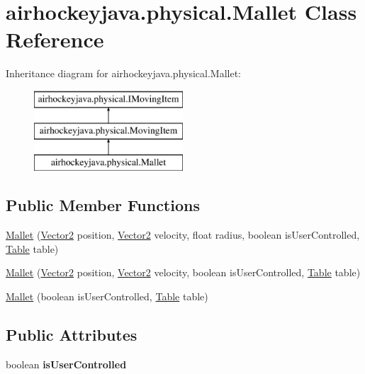 \hypertarget{classairhockeyjava_1_1physical_1_1_mallet}{}\section{airhockeyjava.\+physical.\+Mallet Class Reference}
\label{classairhockeyjava_1_1physical_1_1_mallet}
Inheritance diagram for airhockeyjava.\+physical.\+Mallet\+:\begin{figure}[H]
\begin{center}
\leavevmode
\includegraphics[height=3.000000cm]{classairhockeyjava_1_1physical_1_1_mallet}
\end{center}
\end{figure}
\subsection*{Public Member Functions}
\begin{DoxyCompactItemize}
\item 
\hyperlink{classairhockeyjava_1_1physical_1_1_mallet_a0e2fca7da8983a505fd85b7630c384e5}{Mallet} (\hyperlink{classairhockeyjava_1_1util_1_1_vector2}{Vector2} position, \hyperlink{classairhockeyjava_1_1util_1_1_vector2}{Vector2} velocity, float radius, boolean is\+User\+Controlled, \hyperlink{classairhockeyjava_1_1physical_1_1_table}{Table} table)
\item 
\hyperlink{classairhockeyjava_1_1physical_1_1_mallet_ad25f8cb041c07c7fdef913868231d7ef}{Mallet} (\hyperlink{classairhockeyjava_1_1util_1_1_vector2}{Vector2} position, \hyperlink{classairhockeyjava_1_1util_1_1_vector2}{Vector2} velocity, boolean is\+User\+Controlled, \hyperlink{classairhockeyjava_1_1physical_1_1_table}{Table} table)
\item 
\hyperlink{classairhockeyjava_1_1physical_1_1_mallet_ad8ceb609d9fa4901489900d91ac0e1a3}{Mallet} (boolean is\+User\+Controlled, \hyperlink{classairhockeyjava_1_1physical_1_1_table}{Table} table)
\end{DoxyCompactItemize}
\subsection*{Public Attributes}
\begin{DoxyCompactItemize}
\item 
\hypertarget{classairhockeyjava_1_1physical_1_1_mallet_aad14146dcadd3f1c43cefd6af2cb9169}{}boolean {\bfseries is\+User\+Controlled}\label{classairhockeyjava_1_1physical_1_1_mallet_aad14146dcadd3f1c43cefd6af2cb9169}

\end{DoxyCompactItemize}
